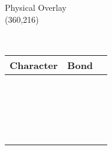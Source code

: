 \documentclass[letterpaper,12pt,landscape,twocolumn]{article}
\begin{document}
\begin{table}
\begin{minipage}{.51\textwidth}
\large{Physical Overlay} \\
\normalsize
\framebox(360,216){~}
\end{minipage}%
%
\begin{minipage}{.02\textwidth}
 ~ 
\end{minipage}%
%
\begin{minipage}{.45\textwidth}
\normalsize
\begin{tabularx}{\textwidth}{|M{2.2cm}|O|N}
\hline
  \textbf{Character} & \textbf{Bond} & \\[20pt] \hline
  ~ & ~ & \\[20pt] \hline
  ~ & ~ & \\[20pt] \hline
  ~ & ~ & \\[20pt] \hline
  ~ & ~ & \\[20pt] \hline
\end{tabularx}
\end{minipage}%


\end{table}
\end{document}
